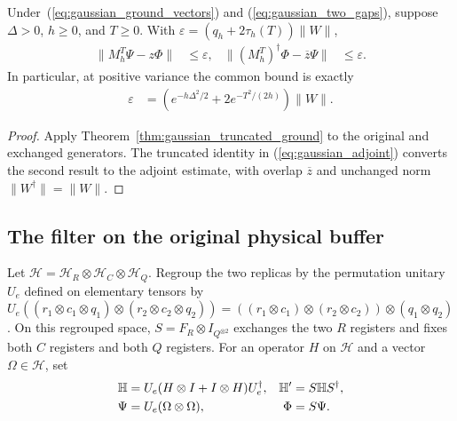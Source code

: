 \begin{theorem}
    \label{thm:gaussian_truncated_two_sided}
    \leanok
    Under~(\ref{eq:gaussian_ground_vectors}) and
    (\ref{eq:gaussian_two_gaps}), suppose $\Delta>0$, $h\ge0$, and $T\ge0$.
    With $\varepsilon=(q_h+2\tau_h(T))\|W\|$,
    \begin{align}
        \|M_h^T\Psi-z\Phi\|&\le\varepsilon, &
        \|(M_h^T)^\dagger\Phi-\overline z\Psi\|&\le\varepsilon.
        \label{eq:gaussian_truncated_two_sided}
    \end{align}
    In particular, at positive variance the common bound is exactly
    \begin{align}
        \varepsilon&=\left(e^{-h\Delta^2/2}
            +2e^{-T^2/(2h)}\right)\|W\|.
        \label{eq:gaussian_truncated_error}
    \end{align}
\end{theorem}
\begin{proof}\leanok
    Apply Theorem~\ref{thm:gaussian_truncated_ground} to the original
    and exchanged generators. The truncated identity in
    (\ref{eq:gaussian_adjoint}) converts the second result to the
    adjoint estimate, with overlap $\overline z$ and unchanged norm
    $\|W^\dagger\|=\|W\|$.
\end{proof}

\subsection{The filter on the original physical buffer}

Let $\mathcal H=\mathcal H_R\otimes\mathcal H_C\otimes\mathcal H_Q$.
Regroup the two replicas by the permutation unitary $U_e$ defined on
elementary tensors by
$U_e((r_1\otimes c_1\otimes q_1)\otimes
(r_2\otimes c_2\otimes q_2))
=((r_1\otimes c_1)\otimes(r_2\otimes c_2))\otimes(q_1\otimes q_2)$.
On this regrouped space, $S=F_R\otimes I_{Q^{\otimes2}}$ exchanges the
two $R$ registers and fixes both $C$ registers and both $Q$ registers.
For an operator $H$ on $\mathcal H$ and a vector $\Omega\in\mathcal H$, set
\begin{align}
    \mathbb H&=U_e(H\otimes I+I\otimes H)U_e^\dagger,
        & \mathbb H'&=S\mathbb H S^\dagger,
        \label{eq:physical_gaussian_system}\\
    \Psi&=U_e(\Omega\otimes\Omega), & \Phi&=S\Psi.
        \notag
\end{align}

